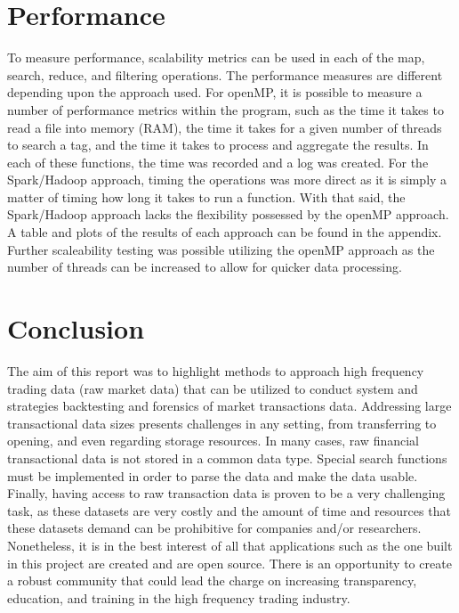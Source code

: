 \documentclass[12pt]{article} %
\begin{document}

\section{Performance}

To measure performance, scalability metrics can be used in each of the map, search, reduce, and filtering operations. The performance measures are different depending upon the approach used. For openMP, it is possible to measure a number of performance metrics within the program, such as the time it takes to read a file into memory (RAM), the time it takes for a given number of threads to search a tag, and the time it takes to process and aggregate the results. In each of these functions, the time was recorded and a log was created. For the Spark/Hadoop approach, timing the operations was more direct as it is simply a matter of timing how long it takes to run a function. With that said, the Spark/Hadoop approach lacks the flexibility possessed by the openMP approach. A table and plots of the results of each approach can be found in the appendix. Further scaleability testing was possible utilizing the openMP approach as the number of threads can be increased to allow for quicker data processing.

\section{Conclusion}

The aim of this report was to highlight methods to approach high frequency trading data (raw market data) that can be utilized to conduct system and strategies backtesting and forensics of market transactions data. Addressing large transactional data sizes presents challenges in any setting, from transferring to opening, and even regarding storage resources. In many cases, raw financial transactional data is not stored in a common data type. Special search functions must be implemented in order to parse the data and make the data usable. Finally, having access to raw transaction data is proven to be a very challenging task, as these datasets are very costly and the amount of time and resources that these datasets demand can be prohibitive for companies and/or researchers. Nonetheless, it is in the best interest of all that applications such as the one built in this project are created and are open source. There is an opportunity to create a robust community that could lead the charge on increasing transparency, education, and training in the high frequency trading industry.
\end{document}

